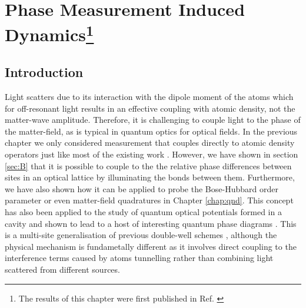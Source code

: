 
\chapter[Phase Measurement Induced Dynamics]
        {Phase Measurement Induced Dynamics\footnote{The results of
            this chapter were first published in
            Ref. \cite{kozlowski2016phase}}}

\ifpdf
    \graphicspath{{Chapter6/Figs/Raster/}{Chapter6/Figs/PDF/}{Chapter6/Figs/}}
\else
    \graphicspath{{Chapter6/Figs/Vector/}{Chapter6/Figs/}}
\fi


\section{Introduction}

Light scatters due to its interaction with the dipole moment of the
atoms which for off-resonant light results in an effective coupling
with atomic density, not the matter-wave amplitude. Therefore, it is
challenging to couple light to the phase of the matter-field, as is
typical in quantum optics for optical fields. In the previous chapter
we only considered measurement that couples directly to atomic density
operators just like most of the existing work \cite{mekhov2012,
  LP2009, rogers2014, ashida2015, ashida2015a}. However, we have shown
in section \ref{sec:B} that it is possible to couple to the the
relative phase differences between sites in an optical lattice by
illuminating the bonds between them. Furthermore, we have also shown
how it can be applied to probe the Bose-Hubbard order parameter or
even matter-field quadratures in Chapter \ref{chap:qnd}. This concept
has also been applied to the study of quantum optical potentials
formed in a cavity and shown to lead to a host of interesting quantum
phase diagrams \cite{caballero2015, caballero2015njp, caballero2016,
  caballero2016a}. This is a multi-site generalisation of previous
double-well schemes \cite{cirac1996, castin1997, ruostekoski1997,
  ruostekoski1998, rist2012}, although the physical mechanism is
fundametally different as it involves direct coupling to the
interference terms caused by atoms tunnelling rather than combining
light scattered from different sources.

